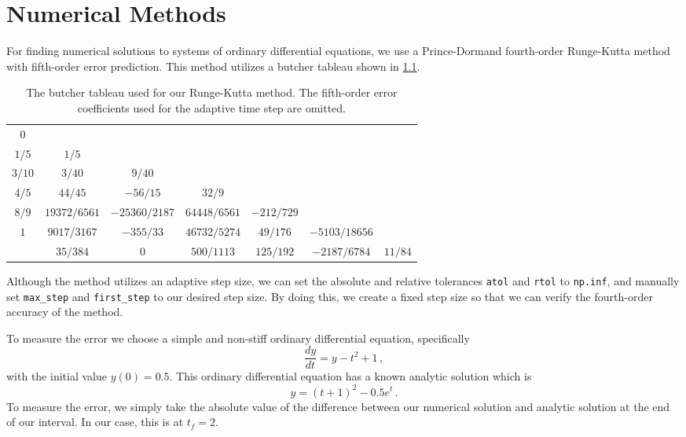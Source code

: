 	\chapter{Numerical Methods}

	For finding numerical solutions to systems of ordinary differential equations, we use a Prince-Dormand fourth-order Runge-Kutta method with fifth-order error prediction. This method utilizes a butcher tableau shown in \ref{table:prince-dormand-butcher}.
	
	\begin{table}[H]
		\centering
		\begin{tabular}{c|cccccc}
			 \(0\)   &                &                 &                &              &                 &           \\
			\(1/5\)  &    \(1/5\)     &                 &                &              &                 &           \\
			\(3/10\) &    \(3/40\)    &    \(9/40\)     &                &              &                 &           \\
			\(4/5\)  &   \(44/45\)    &   \(-56/15\)    &    \(32/9\)    &              &                 &           \\
			\(8/9\)  & \(19372/6561\) & \(-25360/2187\) & \(64448/6561\) & \(-212/729\) &                 &           \\
			 \(1\)   & \(9017/3167\)  &   \(-355/33\)   & \(46732/5274\) &  \(49/176\)  & \(-5103/18656\) &           \\ \hline
			         &   \(35/384\)   &      \(0\)      &  \(500/1113\)  & \(125/192\)  & \(-2187/6784\)  & \(11/84\)
		\end{tabular}
		\caption{The butcher tableau used for our Runge-Kutta method. The fifth-order error coefficients used for the adaptive time step are omitted.}
		\label{table:prince-dormand-butcher}
	\end{table}
	
	Although the method utilizes an adaptive step size, we can set the absolute and relative tolerances \lstinline{atol} and \lstinline{rtol} to \lstinline{np.inf}, and manually set \lstinline{max_step} and \lstinline{first_step} to our desired step size. By doing this, we create a fixed step size so that we can verify the fourth-order accuracy of the method.
	
	To measure the error we choose a simple and non-stiff ordinary differential equation, specifically
	\begin{equation*}
		\frac{dy}{dt} = y - t^2 + 1\,,
	\end{equation*}
	with the initial value \(y(0) = 0.5\). This ordinary differential equation has a known analytic solution which is
	\begin{equation*}
		y = (t + 1)^2 - 0.5e^t \,.
	\end{equation*}
	To measure the error, we simply take the absolute value of the difference between our numerical solution and analytic solution at the end of our interval. In our case, this is at \(t_f=2\). 
	
